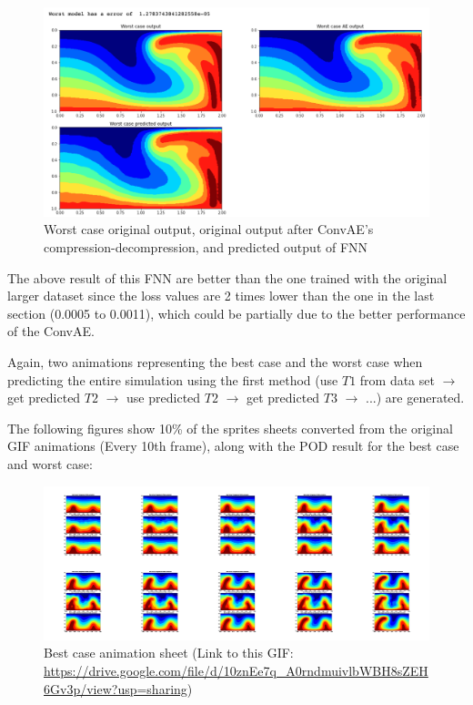 \begin{figure}[H]
    \caption{Worst case original output, original output after ConvAE's compression-decompression, and predicted output of FNN}
    \includegraphics[scale=0.5]{figures/mantle_convection_images/larger_dataset_interpolated/FNN_Worst.png}
\end{figure}

The above result of this FNN are better than the one trained with the original larger dataset since the loss values are 2 times lower than the one in the last section (0.0005 to 0.0011), which could be partially due to the better performance of the ConvAE.

Again, two animations representing the best case and the worst case when predicting the entire simulation using the first method (use $T1$ from data set $\rightarrow$ get predicted $T2$ $\rightarrow$ use predicted $T2$ $\rightarrow$ get predicted $T3$ $\rightarrow$ ...) are generated.

The following figures show 10\% of the sprites sheets converted from the original GIF animations (Every 10th frame), along with the POD result for the best case and worst case:

\begin{figure}[H]
    \centering
    \caption{Best case animation sheet (Link to this GIF: \url{https://drive.google.com/file/d/10znEe7q_A0rndmuivlbWBH8sZEH6Gv3p/view?usp=sharing})}
    \includegraphics[scale=0.10]{figures/mantle_convection_images/larger_dataset_interpolated/FNN_Best_GIF_sheet.png}
\end{figure}

